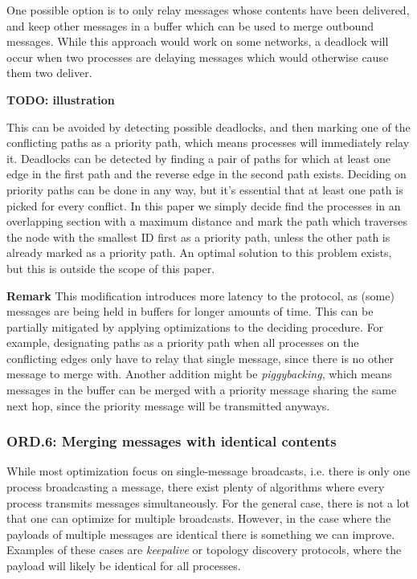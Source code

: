 One possible option is to only relay messages whose contents have been delivered, and keep other messages in a buffer which can be used to merge outbound messages. While this approach would work on some networks, a deadlock will occur when two processes are delaying messages which would otherwise cause them two deliver.

\textbf{TODO: illustration}

This can be avoided by detecting possible deadlocks, and then marking one of the conflicting paths as a priority path, which means processes will immediately relay it. Deadlocks can be detected by finding a pair of paths for which at least one edge in the first path and the reverse edge in the second path exists. Deciding on priority paths can be done in any way, but it's essential that at least one path is picked for every conflict. In this paper we simply decide find the processes in an overlapping section with a maximum distance and mark the path which traverses the node with the smallest ID first as a priority path, unless the other path is already marked as a priority path. An optimal solution to this problem exists, but this is outside the scope of this paper.

\textbf{Remark}
This modification introduces more latency to the protocol, 
as (some) messages are being held in buffers for longer amounts of time. This can be partially mitigated by applying optimizations to the deciding procedure. For example, designating paths as a priority path when all processes on the conflicting edges only have to relay that single message, since there is no other message to merge with. Another addition might be \textit{piggybacking}, which means messages in the buffer can be merged with a priority message sharing the same next hop, since the priority message will be transmitted anyways.



\subsubsection{ORD.6: Merging messages with identical contents}
While most optimization focus on single-message broadcasts, i.e. there is only one process broadcasting a message, there exist plenty of algorithms where every process transmits messages simultaneously. For the general case, there is not a lot that one can optimize for multiple broadcasts. However, in the case where the payloads of multiple messages are identical there is something we can improve. Examples of these cases are \textit{keepalive} or topology discovery protocols, where the payload will likely be identical for all processes. 

